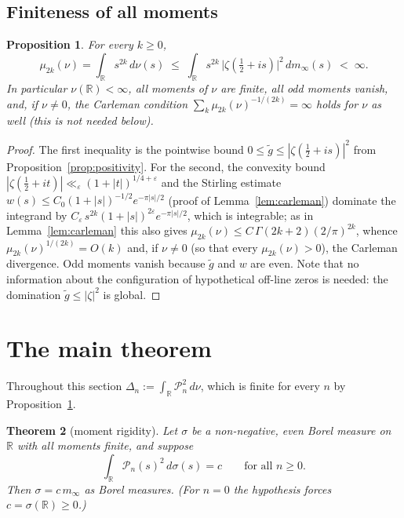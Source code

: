 \documentclass[11pt]{amsart}
\newtheorem{theorem}{Theorem}[section]
\newtheorem{proposition}[theorem]{Proposition}
\theoremstyle{definition}
\theoremstyle{remark}
\newcommand{\bbR}{\mathbb{R}}
\newcommand{\minf}{m_\infty}
\begin{document}
\subsection{Finiteness of all moments}

\begin{proposition}\label{prop:moments}
For every $k\ge0$,
\[
\mu_{2k}(\nu)=\int_{\bbR}s^{2k}\,d\nu(s)
\;\le\;\int_{\bbR}s^{2k}\,\bigl|\zeta(\tfrac12+is)\bigr|^{2}\,d\minf(s)
\;<\;\infty .
\]
In particular $\nu(\bbR)<\infty$, all moments of $\nu$ are finite, all odd
moments vanish, and, if $\nu\neq0$, the Carleman condition
$\sum_k\mu_{2k}(\nu)^{-1/(2k)}=\infty$ holds for $\nu$ as well (this is not
needed below).
\end{proposition}

\begin{proof}
The first inequality is the pointwise bound
$0\le\tilde g\le|\zeta(\tfrac12+is)|^{2}$ from
Proposition~\ref{prop:positivity}. For the second, the convexity bound
$|\zeta(\tfrac12+it)|\ll_\varepsilon(1+|t|)^{1/4+\varepsilon}$
\cite[Chap.~V]{Titchmarsh} and the Stirling estimate
$w(s)\le C_0(1+|s|)^{-1/2}e^{-\pi|s|/2}$ (proof of
Lemma~\ref{lem:carleman}) dominate the integrand by
$C_\varepsilon\,s^{2k}(1+|s|)^{2\varepsilon}e^{-\pi|s|/2}$, which is
integrable; as in Lemma~\ref{lem:carleman} this also gives
$\mu_{2k}(\nu)\le C\,\Gamma(2k+2)(2/\pi)^{2k}$, whence
$\mu_{2k}(\nu)^{1/(2k)}=O(k)$ and, if $\nu\neq0$ (so that every
$\mu_{2k}(\nu)>0$), the Carleman divergence. Odd moments
vanish because $\tilde g$ and $w$ are even. Note that no information about
the configuration of hypothetical off-line zeros is needed: the domination
$\tilde g\le|\zeta|^{2}$ is global.
\end{proof}

\section{The main theorem}\label{sec:main}

Throughout this section $\Delta_n:=\int_\bbR\mathcal P_n^{2}\,d\nu$, which is
finite for every $n$ by Proposition~\ref{prop:moments}.

\begin{theorem}[moment rigidity]\label{thm:rigidity}
Let $\sigma$ be a non-negative, even Borel measure on $\bbR$ with all
moments finite, and suppose
\[
\int_\bbR\mathcal P_n(s)^{2}\,d\sigma(s)=c\qquad\text{for all }n\ge0 .
\]
Then $\sigma=c\,\minf$ as Borel measures. (For $n=0$ the hypothesis forces
$c=\sigma(\bbR)\ge0$.)
\end{theorem}
\end{document}

